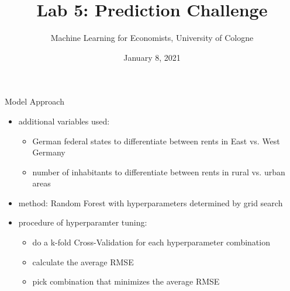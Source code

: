 \documentclass[11pt]{beamer}\usepackage[]{graphicx}\usepackage[]{color}
\title{Lab 5: Prediction Challenge}
\subtitle{Machine Learning for Economists, University of Cologne}
\date{January 8, 2021}
\begin{document}
\begin{frame}
\vspace{0.18cm}
\maketitle
\begin{center}
\end{center}
\vspace{0.1cm}
\end{frame}


\begin{frame}{Model Approach}
\begin{itemize}
\item additional variables used: 
\begin{itemize}
\item German federal states to differentiate between rents in East vs. West Germany 
\item number of inhabitants to differentiate between rents in rural vs. urban areas
\end{itemize}
\item method: Random Forest with hyperparameters determined by grid search
\item procedure of hyperparamter tuning:
\begin{itemize}
\item do a k-fold Cross-Validation for each hyperparameter combination
\item calculate the average RMSE
\item pick combination that minimizes the average RMSE
\end{itemize}
\end{itemize}
\end{frame}
\end{document}
